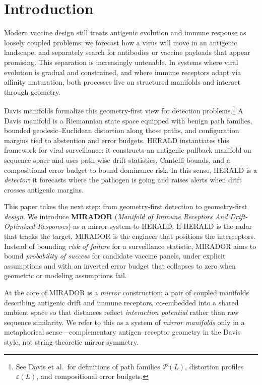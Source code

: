 \documentclass[11pt]{article}
\newcommand{\Pcal}{\mathcal{P}}
\begin{document}
\section{Introduction}

Modern vaccine design still treats antigenic evolution and immune response as loosely coupled
problems: we forecast how a virus will move in an antigenic landscape, and separately search for
antibodies or vaccine payloads that appear promising. This separation is increasingly untenable.
In systems where viral evolution is gradual and constrained, and where immune receptors adapt
via affinity maturation, both processes live on structured manifolds and interact through geometry.

Davis manifolds formalize this geometry-first view for detection problems.\footnote{See Davis
et al.\ for definitions of path families $\Pcal(L)$, distortion profiles $\varepsilon(L)$, and compositional
error budgets.} A Davis manifold is a Riemannian state space equipped with benign path families,
bounded geodesic--Euclidean distortion along those paths, and configuration margins tied to
abstention and error budgets. HERALD instantiates this framework for viral
surveillance: it constructs an antigenic pullback manifold on sequence space and uses path-wise
drift statistics, Cantelli bounds, and a compositional error budget to bound dominance risk.
In this sense, HERALD is a \emph{detector}: it forecasts where the pathogen is going and raises
alerts when drift crosses antigenic margins.

This paper takes the next step: from geometry-first detection to geometry-first \emph{design}.
We introduce \textbf{MIRADOR} (\emph{Manifold of Immune Receptors And Drift-Optimized
Responses}) as a mirror-system to HERALD. If HERALD is the radar that tracks the target,
MIRADOR is the engineer that positions the interceptors. Instead of bounding \emph{risk of failure}
for a surveillance statistic, MIRADOR aims to bound \emph{probability of success} for candidate
vaccine panels, under explicit assumptions and with an inverted error budget that collapses to
zero when geometric or modeling assumptions fail.

At the core of MIRADOR is a \emph{mirror} construction: a pair of coupled manifolds describing
antigenic drift and immune receptors, co-embedded into a shared ambient space so that distances
reflect \emph{interaction potential} rather than raw sequence similarity. We refer to this as a system
of \emph{mirror manifolds} only in a metaphorical sense---complementary antigen--receptor geometry
in the Davis style, not string-theoretic mirror symmetry.
\end{document}
